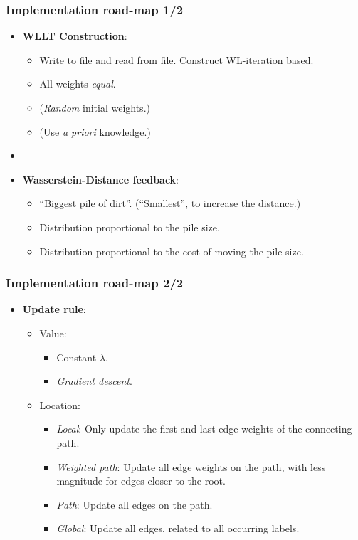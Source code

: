 \begin{frame}
\frametitle{Implementation road-map 1/2}
\begin{itemize}
	\item \textbf{WLLT Construction}:
		\begin{itemize}
			\item Write to file and read from file. Construct WL-iteration based.
			\item All weights \textit{equal}.
			\item (\textit{Random} initial weights.)
			\item (Use \textit{a priori} knowledge.)
		\end{itemize}
	\item[]
	\item \textbf{Wasserstein-Distance feedback}:
		\begin{itemize}
			\item \enquote{Biggest pile of dirt}. 
			(\enquote{Smallest}, to increase the distance.)
			\item Distribution proportional to the pile size.
			\item Distribution proportional to the cost of moving the pile size.
		\end{itemize}	
\end{itemize}	
\end{frame}

\begin{frame}
\frametitle{Implementation road-map 2/2}
\begin{itemize}
	\item \textbf{Update rule}:
	\begin{itemize}
		\item Value:
		\begin{itemize}
			\item Constant $\lambda$.
			\item \textit{Gradient descent}.
		\end{itemize}
		\item Location:
		\begin{itemize}
			\item \textit{Local}: Only update the first and last edge weights of the connecting path.
			\item \textit{Weighted path}: Update all edge weights on the path, with less magnitude for edges closer to the root.
			\item \textit{Path}: Update all edges on the path.
			\item \textit{Global}: Update all edges, related to all occurring labels.
		\end{itemize}
	\end{itemize}		
\end{itemize}	
\end{frame}

